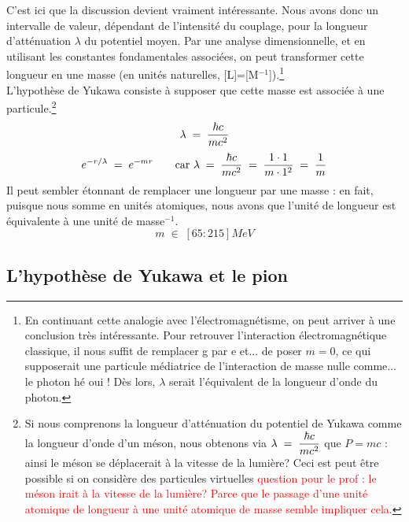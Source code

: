 C'est ici que la discussion devient vraiment intéressante. Nous avons donc un intervalle de valeur, dépendant de l'intensité du couplage, pour la longueur d'atténuation $\lambda$ du potentiel moyen. Par une analyse dimensionnelle, et en utilisant les constantes fondamentales associées, on peut transformer cette longueur en une masse (en unités naturelles, [L]=[M$^{-1}$]).\footnote{En continuant cette analogie avec l'électromagnétisme, on peut arriver à une conclusion très intéressante. Pour retrouver l'interaction électromagnétique classique, il nous suffit de remplacer g par e et... de poser $m = 0$, ce qui supposerait une particule médiatrice de l'interaction de masse nulle comme... le photon hé oui ! Dès lors, $\lambda$ serait l'équivalent de la longueur d'onde du photon.}\\
L'hypothèse de Yukawa consiste à supposer que cette masse est associée à une particule.\footnote{Si nous comprenons la longueur d'atténuation du potentiel de Yukawa comme la longueur d'onde d'un méson, nous obtenons via $\lambda \; = \; \dfrac{\hbar c}{mc^2}$ que $P=mc$ : ainsi le méson se déplacerait à la vitesse de la lumière? Ceci est peut être possible si on considère des particules virtuelles \textcolor{red}{question pour le prof : le méson irait à la vitesse de la lumière? Parce que le passage d'une unité atomique de longueur à une unité atomique de masse semble impliquer cela.}}\\
\begin{equation*}
    \lambda \; = \; \dfrac{\hbar c}{mc^2}
\end{equation*}
\begin{equation*}
    e^{-r/\lambda} \; = \; e^{-mr} \qquad \text{car } \lambda \; = \; \dfrac{\hbar c}{mc^2} \; = \; \dfrac{1\cdot 1}{m \cdot 1^2} \; = \; \dfrac{1}{m}
\end{equation*}
Il peut sembler étonnant de remplacer une longueur par une masse : en fait, puisque nous somme en unités atomiques, nous avons que l'unité de longueur est équivalente à une unité de masse$^{-1}$.
\begin{equation*}
    m\;\in\; [65:215]MeV
\end{equation*}


\subsection{L'hypothèse de Yukawa et le pion}




